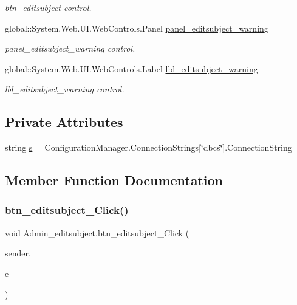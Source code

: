\begin{DoxyCompactItemize}
\begin{DoxyCompactList}\small\item\em btn\+\_\+editsubject control. \end{DoxyCompactList}\item 
global\+::\+System.\+Web.\+U\+I.\+Web\+Controls.\+Panel \mbox{\hyperlink{class_admin__editsubject_a18b2679a242158de4a729520ab49e17c}{panel\+\_\+editsubject\+\_\+warning}}
\begin{DoxyCompactList}\small\item\em panel\+\_\+editsubject\+\_\+warning control. \end{DoxyCompactList}\item 
global\+::\+System.\+Web.\+U\+I.\+Web\+Controls.\+Label \mbox{\hyperlink{class_admin__editsubject_a5916528089fba4db5b376d683d3ad94c}{lbl\+\_\+editsubject\+\_\+warning}}
\begin{DoxyCompactList}\small\item\em lbl\+\_\+editsubject\+\_\+warning control. \end{DoxyCompactList}\end{DoxyCompactItemize}
\subsection*{Private Attributes}
\begin{DoxyCompactItemize}
\item 
string \mbox{\hyperlink{class_admin__editsubject_a594d7e58b6b4cd2b61fff292cd6ae36b}{s}} = Configuration\+Manager.\+Connection\+Strings\mbox{[}\char`\"{}dbcs\char`\"{}\mbox{]}.Connection\+String
\end{DoxyCompactItemize}


\subsection{Member Function Documentation}
\mbox{\label{class_admin__editsubject_a6c1a3f3dce23357d1fa9ad3d83c2c814}} 
\subsubsection{\texorpdfstring{btn\_editsubject\_Click()}{btn\_editsubject\_Click()}}
{\footnotesize\ttfamily void Admin\+\_\+editsubject.\+btn\+\_\+editsubject\+\_\+\+Click (\begin{DoxyParamCaption}\item[{object}]{sender,  }\item[{Event\+Args}]{e }\end{DoxyParamCaption})\hspace{0.3cm}{\ttfamily [protected]}}

